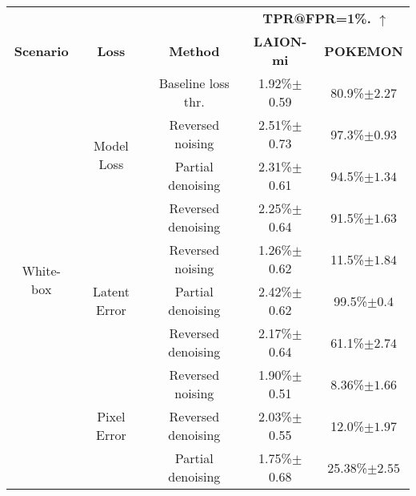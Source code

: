 \begin{tabular}{c c c c c}
    \toprule
                                &                               &                        & \multicolumn{2}{c}{\textbf{TPR@FPR=1\%. $\uparrow$}}                      \\
    \textbf{Scenario}           & \textbf{Loss}                 & \textbf{Method}        & \textbf{ LAION-mi}                                   & \textbf{POKEMON}   \\

    \midrule
    \multirow{10}{*}{White-box} & \multirow{4}{*}{Model Loss}   & Baseline loss thr.     & 1.92\%$\pm$0.59                                      & 80.9\%$\pm2.27$    \\
    \cmidrule{3-5}

                                &                               & Reversed noising       & 2.51\%$\pm$0.73                                      & 97.3\%$\pm0.93$    \\
                                &                               & Partial denoising      & 2.31\%$\pm$0.61                                      & 94.5\%$\pm1.34$    \\
                                &                               & Reversed denoising     & 2.25\%$\pm$0.64                                      & 91.5\%$\pm1.63$    \\


    \cmidrule{2-5}

                                & \multirow{3}{*}{Latent Error} & Reversed noising       & 1.26\%$\pm$0.62                                      & 11.5\%$\pm1.84$    \\
                                &                               & Partial denoising      & 2.42\%$\pm$0.62                                      & 99.5\%$\pm0.4$   \\
                                &                               & Reversed denoising     & 2.17\%$\pm$0.64                                      & 61.1\%$\pm2.74$    \\

    \cmidrule{2-5}


                                & \multirow{3}{*}{Pixel Error}  & Reversed noising       & 1.90\%$\pm$0.51                                      & 8.36\%$\pm1.66$    \\
                                &                               & Reversed denoising     & 2.03\%$\pm$0.55                                    & 12.0\%$\pm1.97$    \\
                                &                               & Partial denoising      & 1.75\%$\pm$0.68                                      & 25.38\%$\pm2.55$ \\
    \midrule


\end{tabular}
